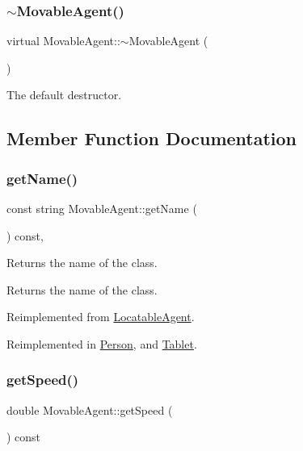 \subsubsection{\texorpdfstring{$\sim$MovableAgent()}{~MovableAgent()}}
{\footnotesize\ttfamily virtual Movable\+Agent\+::$\sim$\+Movable\+Agent (\begin{DoxyParamCaption}{ }\end{DoxyParamCaption})\hspace{0.3cm}{\ttfamily [virtual]}}

The default destructor. 

\subsection{Member Function Documentation}
\mbox{\label{class_movable_agent_abcc1218876c39c996f2cb1eba2b96379}} 
\subsubsection{\texorpdfstring{getName()}{getName()}}
{\footnotesize\ttfamily const string Movable\+Agent\+::get\+Name (\begin{DoxyParamCaption}{ }\end{DoxyParamCaption}) const\hspace{0.3cm}{\ttfamily [override]}, {\ttfamily [virtual]}}

Returns the name of the class. \begin{DoxyReturn}{Returns}
the name of the class. 
\end{DoxyReturn}


Reimplemented from \mbox{\hyperlink{class_locatable_agent_a754105958bb672744b525538f1584a7b}{Locatable\+Agent}}.



Reimplemented in \mbox{\hyperlink{class_person_aa2a6f8d7f1d94045a03ca578f2ed272c}{Person}}, and \mbox{\hyperlink{class_tablet_adc7196aaee1e9714236b7cd8825d5826}{Tablet}}.

\mbox{\label{class_movable_agent_a12fcdaee60f5bb29f15fe113a7dacaac}} 
\subsubsection{\texorpdfstring{getSpeed()}{getSpeed()}}
{\footnotesize\ttfamily double Movable\+Agent\+::get\+Speed (\begin{DoxyParamCaption}{ }\end{DoxyParamCaption}) const}

